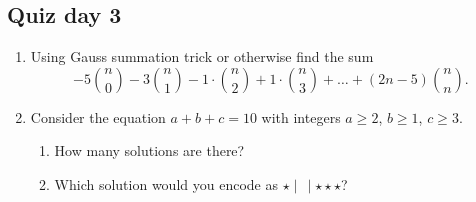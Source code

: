 \documentclass[12pt]{article}
\begin{document}


\subsection*{Quiz day 3}

\begin{enumerate}

    \item Using Gauss summation trick or otherwise find the sum 
    \[
    -5{n\choose 0} -3 {n \choose 1} -1 \cdot {n \choose 2} + 1 \cdot {n \choose 3} + \dots + (2n - 5) {n \choose n}.
    \]
    \item Consider the equation $a + b + c = 10$ with integers $a \geq 2$, $b \geq 1$, $c\geq 3$.

    \begin{enumerate}
        \item How many solutions are there?
        \item Which solution would you encode as $\star \mid \, \mid \star\star\star$?
    \end{enumerate}
\end{enumerate}
\end{document}
